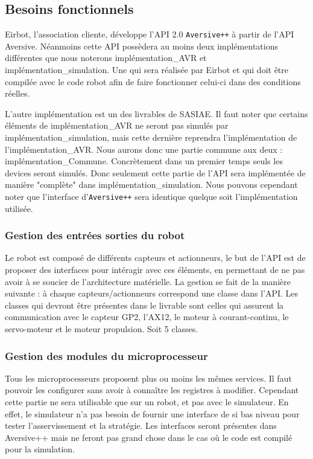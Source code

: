 \subsection{Besoins fonctionnels}

Eirbot, l'association cliente, développe l'API 2.0 \texttt{Aversive++} à partir de l'API Aversive. Néanmoins cette API possèdera au moins deux implémentations différentes que nous noterons implémentation\_AVR et implémentation\_simulation. Une qui sera réalisée par Eirbot et qui doit être compilée avec le code robot afin de faire fonctionner celui-ci dans des conditions réelles. 

L'autre implémentation est un des livrables de SASIAE. Il faut noter que certains éléments de implémentation\_AVR ne seront pas simulés par implémentation\_simulation, mais cette dernière reprendra l'implémentation de l'implémentation\_AVR. Nous aurons donc une partie commune aux deux : implémentation\_Commune. 
Concrètement dans un premier temps seuls les devices seront simulés. Donc seulement cette partie de l'API sera implémentée de manière "complète" dans implémentation\_simulation. Nous pouvons cependant noter que l'interface d'\texttt{Aversive++} sera %
identique quelque soit l'implémentation utilisée.

\subsubsection{Gestion des entrées sorties du robot}

Le robot est composé de différents capteurs et actionneurs, le but de l'API est de proposer des interfaces pour intéragir avec ces éléments, en permettant de ne pas avoir à se soucier de l'architecture matérielle. La gestion se fait de la manière suivante : à chaque capteurs/actionneurs correspond une classe dans l'API. Les classes qui devront être présentes dans le livrable sont celles qui assurent la communication avec le capteur GP2, l'AX12, le moteur à courant-continu, le servo-moteur et le moteur propulsion.
Soit 5 classes.

\subsubsection{Gestion des modules du microprocesseur}

Tous les microprocesseurs proposent plus ou moins les mêmes services. Il faut pouvoir les configurer sans avoir à connaître les registres à modifier. Cependant cette partie ne sera utilisable que sur un robot, et pas avec le simulateur. En effet, le simulateur n'a pas besoin de fournir une interface de si bas niveau pour tester l'asservissement et la stratégie. Les interfaces seront présentes dans Aversive++ mais ne feront pas grand chose dans le cas où le code est compilé pour la simulation.

